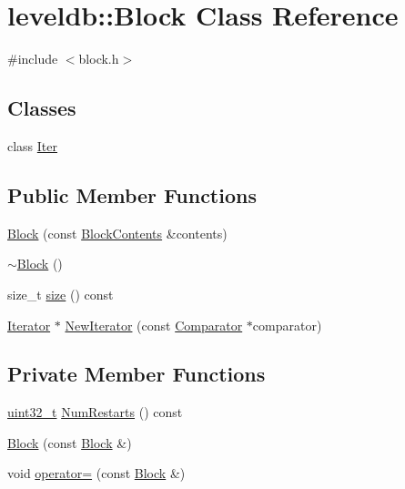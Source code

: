 \hypertarget{classleveldb_1_1_block}{\section{leveldb\-:\-:Block Class Reference}
\label{classleveldb_1_1_block}
}


{\ttfamily \#include $<$block.\-h$>$}

\subsection*{Classes}
\begin{DoxyCompactItemize}
\item 
class \hyperlink{classleveldb_1_1_block_1_1_iter}{Iter}
\end{DoxyCompactItemize}
\subsection*{Public Member Functions}
\begin{DoxyCompactItemize}
\item 
\hyperlink{classleveldb_1_1_block_a242f2101a3c906b6f75f5c008e3ecdd9}{Block} (const \hyperlink{structleveldb_1_1_block_contents}{Block\-Contents} \&contents)
\item 
\hyperlink{classleveldb_1_1_block_a949c8f02dd434861cc1c352bd258ea47}{$\sim$\-Block} ()
\item 
size\-\_\-t \hyperlink{classleveldb_1_1_block_aa3834a89827b5363c11fbdca6d0b1c92}{size} () const 
\item 
\hyperlink{classleveldb_1_1_iterator}{Iterator} $\ast$ \hyperlink{classleveldb_1_1_block_a336289029f37d18d31a1a3c178afc7b3}{New\-Iterator} (const \hyperlink{structleveldb_1_1_comparator}{Comparator} $\ast$comparator)
\end{DoxyCompactItemize}
\subsection*{Private Member Functions}
\begin{DoxyCompactItemize}
\item 
\hyperlink{stdint_8h_a435d1572bf3f880d55459d9805097f62}{uint32\-\_\-t} \hyperlink{classleveldb_1_1_block_a50f716365aa5b729943a1c3eb2d06e9d}{Num\-Restarts} () const 
\item 
\hyperlink{classleveldb_1_1_block_aebf36b5f374595cebbfcf1198ff47bee}{Block} (const \hyperlink{classleveldb_1_1_block}{Block} \&)
\item 
void \hyperlink{classleveldb_1_1_block_ac09f49a49d41ead362aaf52176a02538}{operator=} (const \hyperlink{classleveldb_1_1_block}{Block} \&)
\end{DoxyCompactItemize}
